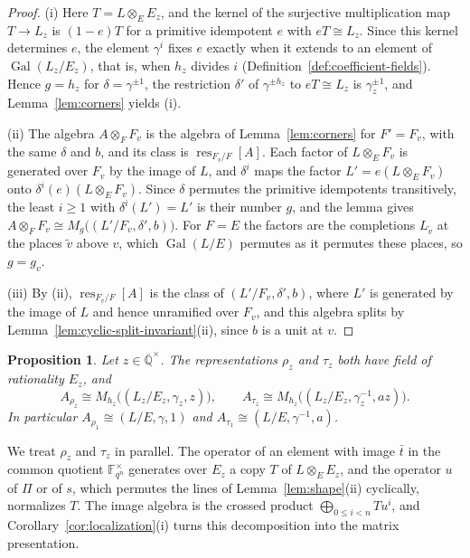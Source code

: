 \documentclass[a4paper,11pt]{amsart}
\newtheorem{proposition}[theorem]{Proposition}
\theoremstyle{definition}
\theoremstyle{remark}
\numberwithin{equation}{section}
\DeclareMathOperator{\res}{res}
\DeclareMathOperator{\Gal}{Gal}
\newcommand{\F}{\mathbb{F}}
\newcommand{\Qbar}{\overline{\mathbb{Q}}}
\begin{document}
\begin{proof}
(i) Here $T=L\otimes_EE_z$, and the kernel of the surjective multiplication map $T\to L_z$ is $(1-e)T$ for a primitive idempotent $e$ with $eT\cong L_z$. Since this kernel determines $e$, the element $\gamma^i$ fixes $e$ exactly when it extends to an element of $\Gal(L_z/E_z)$, that is, when $h_z$ divides $i$ (Definition~\ref{def:coefficient-fields}). Hence $g=h_z$ for $\delta=\gamma^{\pm1}$, the restriction $\delta'$ of $\gamma^{\pm h_z}$ to $eT\cong L_z$ is $\gamma_z^{\pm1}$, and Lemma~\ref{lem:corners} yields (i).

(ii) The algebra $A\otimes_FF_v$ is the algebra of Lemma~\ref{lem:corners} for $F'=F_v$, with the same $\delta$ and $b$, and its class is $\res_{F_v/F}[A]$. Each factor of $L\otimes_EF_v$ is generated over $F_v$ by the image of $L$, and $\delta^i$ maps the factor $L'=e(L\otimes_EF_v)$ onto $\delta^i(e)(L\otimes_EF_v)$. Since $\delta$ permutes the primitive idempotents transitively, the least $i\ge1$ with $\delta^i(L')=L'$ is their number $g$, and the lemma gives $A\otimes_FF_v\cong M_g\bigl((L'/F_v,\delta',b)\bigr)$. For $F=E$ the factors are the completions $L_{\tilde v}$ at the places $\tilde v$ above $v$, which $\Gal(L/E)$ permutes as it permutes these places, so $g=g_v$.

(iii) By (ii), $\res_{F_v/F}[A]$ is the class of $(L'/F_v,\delta',b)$, where $L'$ is generated by the image of $L$ and hence unramified over $F_v$, and this algebra splits by Lemma~\ref{lem:cyclic-split-invariant}(ii), since $b$ is a unit at $v$.
\end{proof}

\begin{proposition}\label{prop:image-algebras}
Let $z\in\Qbar^\times$. The representations $\rho_z$ and $\tau_z$ both have field of rationality $E_z$, and
\[
 A_{\rho_z}\cong M_{h_z}\bigl((L_z/E_z,\gamma_z,z)\bigr),\qquad A_{\tau_z}\cong M_{h_z}\bigl((L_z/E_z,\gamma_z^{-1},az)\bigr).
\]
In particular $A_{\rho_1}\cong(L/E,\gamma,1)$ and $A_{\tau_1}\cong(L/E,\gamma^{-1},a)$.
\end{proposition}

We treat $\rho_z$ and $\tau_z$ in parallel. The operator of an element with image $\bar t$ in the common quotient $\F_{q^n}^\times$ generates over $E_z$ a copy $T$ of $L\otimes_EE_z$, and the operator $u$ of $\Pi$ or of $s$, which permutes the lines of Lemma~\ref{lem:shape}(ii) cyclically, normalizes $T$. The image algebra is the crossed product $\bigoplus_{0\leq i<n}Tu^i$, and Corollary~\ref{cor:localization}(i) turns this decomposition into the matrix presentation.
\end{document}

